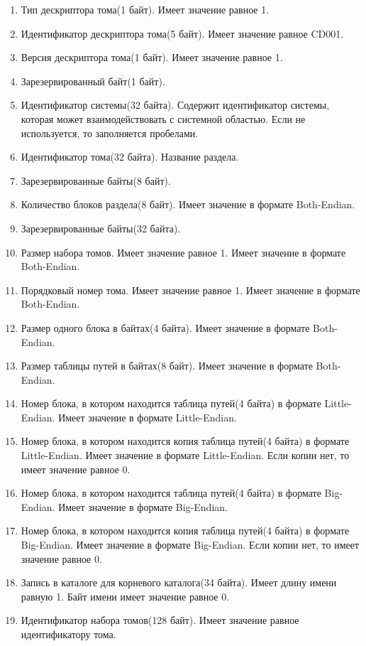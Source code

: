 \begin{enumerate}
\item Тип дескриптора тома(1 байт). Имеет значение равное 1.
\item Идентификатор дескриптора тома(5 байт). Имеет значение равное \textquotedbl CD001\textquotedbl.
\item Версия дескриптора тома(1 байт). Имеет значение равное 1.
\item Зарезервированный байт(1 байт).
\item Идентификатор системы(32 байта). Содержит идентификатор системы, которая может взаимодействовать с системной областью. Если не используется, то заполняется пробелами.
\item Идентификатор тома(32 байта). Название раздела.
\item Зарезервированные байты(8 байт).
\item Количество блоков раздела(8 байт). Имеет значение в формате Both-Endian.
\item Зарезервированные байты(32 байта).
\item Размер набора томов. Имеет значение равное 1. Имеет значение в формате Both-Endian.
\item Порядковый номер тома. Имеет значение равное 1. Имеет значение в формате Both-Endian.
\item Размер одного блока в байтах(4 байта). Имеет значение в формате Both-Endian.
\item Размер таблицы путей в байтах(8 байт). Имеет значение в формате Both-Endian.
\item Номер блока, в котором находится таблица путей(4 байта) в формате Little-Endian. Имеет значение в формате Little-Endian.
\item Номер блока, в котором находится копия таблица путей(4 байта) в формате Little-Endian. Имеет значение в формате Little-Endian. Если копии нет, то имеет значение равное 0.
\item Номер блока, в котором находится таблица путей(4 байта) в формате Big-Endian. Имеет значение в формате Big-Endian.
\item Номер блока, в котором находится копия таблица путей(4 байта) в формате Big-Endian. Имеет значение в формате Big-Endian. Если копии нет, то имеет значение равное 0.
\item Запись в каталоге для корневого каталога(34 байта). Имеет длину имени равную 1. Байт имени имеет значение равное 0.
\item Идентификатор набора томов(128 байт). Имеет значение равное идентификатору тома.

\end{enumerate}
